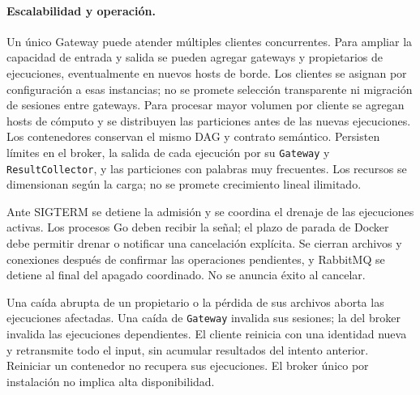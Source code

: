 \paragraph{Escalabilidad y operación.}
Un único Gateway puede atender múltiples clientes concurrentes. Para ampliar
la capacidad de entrada y salida se pueden agregar gateways y propietarios de
ejecuciones, eventualmente en nuevos hosts de borde. Los clientes se asignan
por configuración a esas instancias; no se promete selección transparente ni
migración de sesiones entre gateways. Para procesar mayor volumen por cliente se agregan hosts de
cómputo y se distribuyen las particiones antes de las nuevas ejecuciones.
Los contenedores conservan el mismo DAG y contrato semántico. Persisten límites
en el broker, la salida de cada ejecución por su \texttt{Gateway} y
\texttt{ResultCollector}, y las particiones con palabras muy frecuentes.
Los recursos se dimensionan según la carga; no se promete crecimiento lineal
ilimitado.

Ante SIGTERM se detiene la admisión y se coordina el drenaje de las ejecuciones
activas. Los procesos Go deben recibir la señal; el plazo de parada de Docker
debe permitir drenar o notificar una cancelación explícita. Se cierran archivos
y conexiones después de confirmar las operaciones pendientes, y RabbitMQ se
detiene al final del apagado coordinado. No se anuncia éxito al cancelar.

Una caída abrupta de un propietario o la pérdida de sus archivos aborta las
ejecuciones afectadas. Una caída de \texttt{Gateway} invalida sus sesiones;
la del broker invalida las ejecuciones dependientes. El cliente reinicia con
una identidad nueva y retransmite todo el input, sin acumular resultados del
intento anterior. Reiniciar un contenedor no recupera sus ejecuciones.
El broker único por instalación no implica alta disponibilidad.

